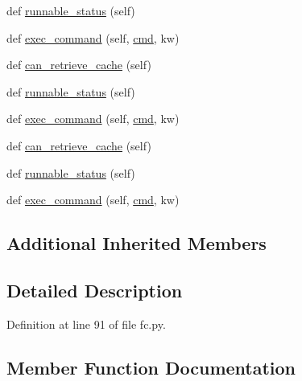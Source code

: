\begin{DoxyCompactItemize}
def \hyperlink{classwaflib_1_1_tools_1_1fc_1_1fcprogram__test_ac31ed0308a3b2605c1e6a7d03bceba16}{runnable\+\_\+status} (self)
\item 
def \hyperlink{classwaflib_1_1_tools_1_1fc_1_1fcprogram__test_ad7090713cc489c66c738ca5d8280e8e5}{exec\+\_\+command} (self, \hyperlink{sndfile__play_8m_adfc5ba7e22f5e4a6221c12a70503bef3}{cmd}, kw)
\item 
def \hyperlink{classwaflib_1_1_tools_1_1fc_1_1fcprogram__test_a913b9f380492fd2def08bdc554cdf700}{can\+\_\+retrieve\+\_\+cache} (self)
\item 
def \hyperlink{classwaflib_1_1_tools_1_1fc_1_1fcprogram__test_ac31ed0308a3b2605c1e6a7d03bceba16}{runnable\+\_\+status} (self)
\item 
def \hyperlink{classwaflib_1_1_tools_1_1fc_1_1fcprogram__test_ad7090713cc489c66c738ca5d8280e8e5}{exec\+\_\+command} (self, \hyperlink{sndfile__play_8m_adfc5ba7e22f5e4a6221c12a70503bef3}{cmd}, kw)
\item 
def \hyperlink{classwaflib_1_1_tools_1_1fc_1_1fcprogram__test_a913b9f380492fd2def08bdc554cdf700}{can\+\_\+retrieve\+\_\+cache} (self)
\item 
def \hyperlink{classwaflib_1_1_tools_1_1fc_1_1fcprogram__test_ac31ed0308a3b2605c1e6a7d03bceba16}{runnable\+\_\+status} (self)
\item 
def \hyperlink{classwaflib_1_1_tools_1_1fc_1_1fcprogram__test_ad7090713cc489c66c738ca5d8280e8e5}{exec\+\_\+command} (self, \hyperlink{sndfile__play_8m_adfc5ba7e22f5e4a6221c12a70503bef3}{cmd}, kw)
\end{DoxyCompactItemize}
\subsection*{Additional Inherited Members}


\subsection{Detailed Description}


Definition at line 91 of file fc.\+py.



\subsection{Member Function Documentation}

